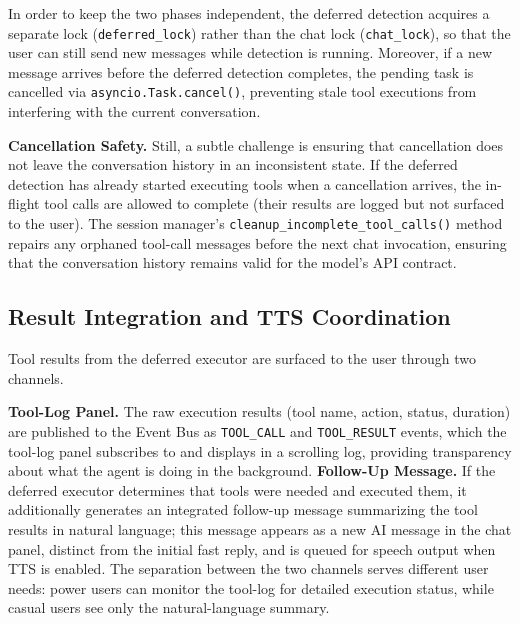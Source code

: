 \documentclass[numbered,mediumone,traditional]{oup-authoring-template}
\begin{document}
In order to keep the two phases independent, the deferred detection acquires a separate lock (\texttt{deferred\_lock}) rather than the chat lock (\texttt{chat\_lock}), so that the user can still send new messages while detection is running. Moreover, if a new message arrives before the deferred detection completes, the pending task is cancelled via \texttt{asyncio.Task.cancel()}, preventing stale tool executions from interfering with the current conversation.

\textbf{Cancellation Safety.} Still, a subtle challenge is ensuring that cancellation does not leave the conversation history in an inconsistent state. If the deferred detection has already started executing tools when a cancellation arrives, the in-flight tool calls are allowed to complete (their results are logged but not surfaced to the user). The session manager's \texttt{cleanup\_incomplete\_tool\_calls()} method repairs any orphaned tool-call messages before the next chat invocation, ensuring that the conversation history remains valid for the model's API contract.

\subsection{Result Integration and TTS Coordination}

Tool results from the deferred executor are surfaced to the user through two channels.

\textbf{Tool-Log Panel.} The raw execution results (tool name, action, status, duration) are published to the Event Bus as \texttt{TOOL\_CALL} and \texttt{TOOL\_RESULT} events, which the tool-log panel subscribes to and displays in a scrolling log, providing transparency about what the agent is doing in the background. \textbf{Follow-Up Message.} If the deferred executor determines that tools were needed and executed them, it additionally generates an integrated follow-up message summarizing the tool results in natural language; this message appears as a new AI message in the chat panel, distinct from the initial fast reply, and is queued for speech output when TTS is enabled. The separation between the two channels serves different user needs: power users can monitor the tool-log for detailed execution status, while casual users see only the natural-language summary.
\end{document}
